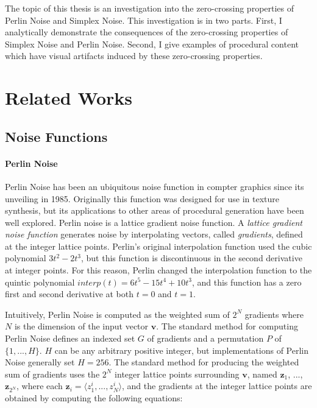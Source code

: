 \documentclass[12pt]{article}
\theoremstyle{definition}
\theoremstyle{remark}
\begin{document}
The topic of this thesis is an investigation into the zero-crossing properties of Perlin Noise and Simplex Noise. This investigation is in two parts. First, I analytically demonstrate the consequences of the zero-crossing properties of Simplex Noise and Perlin Noise. Second, I give examples of procedural content which have visual artifacts induced by these zero-crossing properties. 

\singlespacing
\section{Related Works}
\doublespacing

\subsection{Noise Functions}

\paragraph{Perlin Noise}

Perlin Noise\cite{perlin1985} has been an ubiquitous noise function in compter graphics since its unveiling in 1985. Originally this function was designed for use in texture synthesis\cite{perlin1985, perlin1989}, but its applications to other areas of procedural generation have been well explored\cite{lagaeetal2010, smelik2014}. Perlin noise is a lattice gradient noise function. A \textit{lattice gradient noise function} generates noise by interpolating vectors, called \textit{gradients}, defined at the integer lattice points. Perlin's original interpolation function used the cubic polynomial $3t^2-2t^3$\cite{perlin1985}, but this function is discontinuous in the second derivative at integer points. For this reason, Perlin changed the interpolation function to the quintic polynomial $interp(t)=6t^5-15t^4+10t^3$, and this function has a zero first and second derivative at both $t=0$ and $t=1$\cite{perlin2002}.

Intuitively, Perlin Noise is computed as the weighted sum of $2^N$ gradients where $N$ is the dimension of the input vector $\textbf{v}$. The standard method for computing Perlin Noise defines an indexed set $G$ of gradients and a permutation $P$ of $\{1, ..., H\}$. $H$ can be any arbitrary positive integer, but implementations of Perlin Noise generally set $H=256$. The standard method for producing the weighted sum of gradients uses the $2^N$ integer lattice points surrounding $\textbf{v}$, named $\textbf{z}_1$, ..., $\textbf{z}_{2^N}$, where each $\textbf{z}_i = \langle z^i_1, ..., z^i_N \rangle$, and the gradients at the integer lattice points are obtained by computing the following equations:
\end{document}
